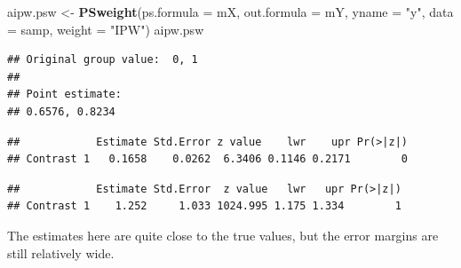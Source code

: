 \documentclass[
]{book}
\newenvironment{Shaded}{\begin{snugshade}}{\end{snugshade}}
\newcommand{\AttributeTok}[1]{\textcolor[rgb]{0.13,0.29,0.53}{#1}}
\newcommand{\DecValTok}[1]{\textcolor[rgb]{0.00,0.00,0.81}{#1}}
\newcommand{\FunctionTok}[1]{\textcolor[rgb]{0.13,0.29,0.53}{\textbf{#1}}}
\newcommand{\NormalTok}[1]{#1}
\newcommand{\OtherTok}[1]{\textcolor[rgb]{0.56,0.35,0.01}{#1}}
\newcommand{\SpecialCharTok}[1]{\textcolor[rgb]{0.81,0.36,0.00}{\textbf{#1}}}
\newcommand{\StringTok}[1]{\textcolor[rgb]{0.31,0.60,0.02}{#1}}
\theoremstyle{definition}
\theoremstyle{definition}
\theoremstyle{definition}
\theoremstyle{definition}
\theoremstyle{remark}
\begin{document}
\begin{Shaded}
\begin{Highlighting}[]
\NormalTok{aipw.psw }\OtherTok{\textless{}{-}} \FunctionTok{PSweight}\NormalTok{(}\AttributeTok{ps.formula =}\NormalTok{ mX, }\AttributeTok{out.formula =}\NormalTok{ mY, }\AttributeTok{yname =} \StringTok{"y"}\NormalTok{,}
                     \AttributeTok{data =}\NormalTok{ samp, }\AttributeTok{weight =} \StringTok{"IPW"}\NormalTok{)}
\NormalTok{aipw.psw}
\end{Highlighting}
\end{Shaded}

\begin{verbatim}
## Original group value:  0, 1 
## 
## Point estimate: 
## 0.6576, 0.8234
\end{verbatim}

\begin{Shaded}
\end{Shaded}

\begin{verbatim}
##            Estimate Std.Error z value    lwr    upr Pr(>|z|)
## Contrast 1   0.1658    0.0262  6.3406 0.1146 0.2171        0
\end{verbatim}

\begin{Shaded}
\end{Shaded}

\begin{verbatim}
##            Estimate Std.Error  z value   lwr   upr Pr(>|z|)
## Contrast 1    1.252     1.033 1024.995 1.175 1.334        1
\end{verbatim}

The estimates here are quite close to the true values, but the error
margins are still relatively wide.
\end{document}
